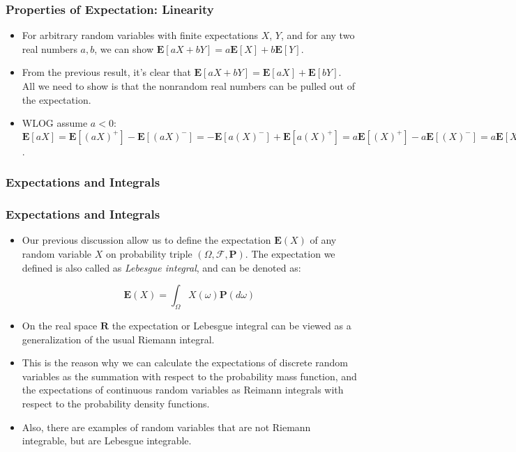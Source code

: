 \documentclass[handout]{beamer}
\newcommand{\BP}{\mathbf{P}}
\newcommand{\BE}{\mathbf{E}}
\begin{document}
\frame
{
  \frametitle{Properties of Expectation: Linearity}

   \begin{itemize}

  \item<1-> [] For arbitrary random variables with finite expectations $X$, $Y$, and for any two real numbers $a,b$, we can show $\BE[aX + bY] = a\BE[X] + b\BE[Y]$.
  
  \item<2-> [] From the previous result, it's clear that $\BE[aX+bY] = \BE[aX] + \BE[bY]$. All we need to show is that the nonrandom real numbers can be pulled out of the expectation.
  
\item<3-> [] WLOG assume $a < 0$: $\BE[aX] = \BE[(aX)^+] - \BE[(aX)^-] =  -\BE[a(X)^-] + \BE[a(X)^+] = a\BE[(X)^+]  -a\BE[(X)^-]  = a\BE[X]$. 


\end{itemize}
}




\subsubsection{Expectations and Integrals }

\frame
{
  \frametitle{Expectations and Integrals}

   \begin{itemize}

   \item<1-> Our previous discussion allow us to define the expectation $\BE(X)$ of any random variable $X$ on probability triple $(\Omega, \mathcal{F}, \BP)$.  The expectation we defined is also called as \textit{Lebesgue integral}, and can be denoted as:
   
   $$\BE(X)=\int_{\Omega} X(\omega) \BP(d \omega) $$
   
     
   \item<2-> On the real space $\mathbf{R}$ the expectation or Lebesgue integral can be viewed as a generalization of the usual Riemann integral. 
   
   \item<3-> This is the reason why we can calculate the expectations of discrete random variables as the summation with respect to the probability mass function, and the expectations of continuous random variables as Reimann integrals with respect to the probability density functions.  
   
   \item<4-> Also, there are examples of random variables that are not Riemann integrable, but are Lebesgue integrable.

\end{itemize}
}
\end{document}
